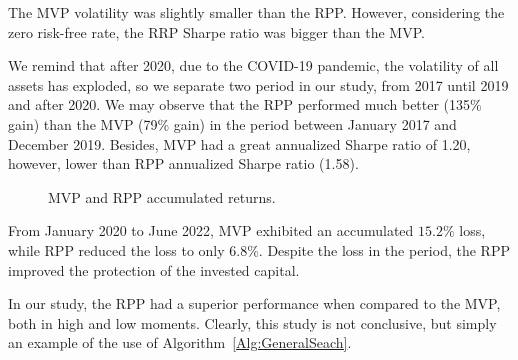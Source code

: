 The MVP volatility was slightly smaller than the RPP. However, considering the zero risk-free rate, the RRP Sharpe ratio was bigger than the MVP.




We remind that after 2020, due to the COVID-19 pandemic, the volatility of all assets has exploded, so we separate two period in our study, from 2017 until 2019 and after 2020. We may observe that the RPP performed much better (135\% gain) than the MVP (79\% gain) in the period between January 2017 and December 2019. Besides, MVP had a great annualized Sharpe ratio of 1.20, however, lower than RPP annualized Sharpe ratio (1.58).



\begin{figure}[H]
	\begin{subfigmatrix}{2}
	\end{subfigmatrix}
	\caption{MVP and RPP accumulated returns.}
	\label{fig:retornoRPPMVP12}
\end{figure}

From January 2020 to June 2022, MVP exhibited an accumulated $15.2\%$ loss, while RPP reduced the loss to only $6.8\%$. Despite the loss in the period, the RPP improved the protection of the invested capital.



In our study, the RPP had a superior performance when compared to the MVP, both in high and low moments. Clearly, this study is not conclusive, but simply an example of the use of Algorithm~\ref{Alg:GeneralSeach}.

